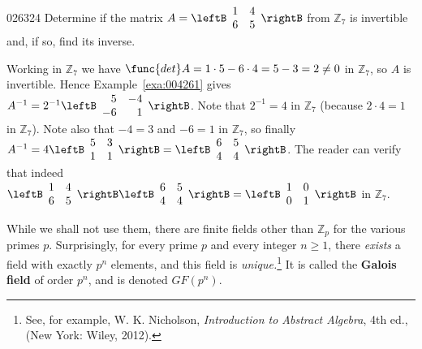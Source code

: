 \begin{example}{}{026324}
Determine if the matrix $A = \leftB \begin{array}{rr}
1 & 4 \\
6 & 5 
\end{array}\rightB$ from $\mathbb{Z}_7$ is invertible and, if so, find its inverse.

\begin{solution}
  Working in $\mathbb{Z}_7$ we have $\func{det} A = 1 \cdot 5 - 6 \cdot 4 = 5 - 3 = 2 \neq 0$ in $\mathbb{Z}_7$, so $A$ is invertible. Hence Example~\ref{exa:004261} gives $A^{-1} = 2^{-1}\leftB \begin{array}{rr}
  5 & -4 \\
  -6 & 1 
  \end{array}\rightB$.
Note that $2^{-1} = 4$ in $\mathbb{Z}_{7}$ (because $2 \cdot 4 = 1$ in $\mathbb{Z}_{7}$). Note also that $-4 = 3$ and $-6 = 1$ in $\mathbb{Z}_7$, so finally $A^{-1} = 4\leftB \begin{array}{rr}
5 & 3 \\
1 & 1 
\end{array}\rightB = \leftB \begin{array}{rr}
6 & 5 \\
4 & 4 
\end{array}\rightB$. The reader can verify that indeed $\leftB \begin{array}{rr}
1 & 4 \\
6 & 5
\end{array}\rightB \leftB \begin{array}{rr}
6 & 5 \\
4 & 4 
\end{array}\rightB = \leftB \begin{array}{rr}
1 & 0 \\
0 & 1 
\end{array}\rightB$ in $\mathbb{Z}_{7}$.
\end{solution}
\end{example}

While we shall not use them, there are finite fields other than $\mathbb{Z}_p$ for the various primes $p$. Surprisingly, for every prime $p$ and every integer $n \geq 1$, there \textit{exists} a field with exactly $p^{n}$ elements, and this field is \textit{unique.}\footnote{See, for example, W. K. Nicholson, \textit{Introduction to Abstract Algebra}, 4th ed., (New York: Wiley, 2012).}
 It is called the \textbf{Galois field} of order $p^{n}$, and is denoted $GF(p^{n})$.

